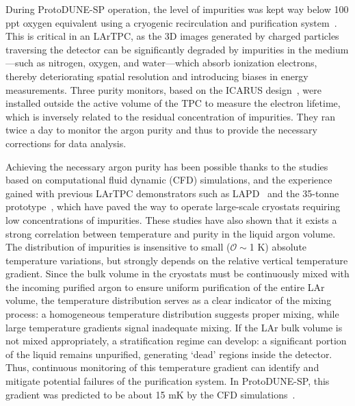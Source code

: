 
During ProtoDUNE-SP operation, the level of impurities was kept way below 100 ppt oxygen equivalent using a cryogenic recirculation and purification system~\cite{pdsp_tdr,pdsp_2}. This is critical in an LArTPC, as the 3D images generated by charged particles traversing the detector can be significantly degraded by impurities in the medium—such as nitrogen, oxygen, and water—which absorb ionization electrons, thereby deteriorating spatial resolution and introducing biases in energy measurements. Three purity monitors, based on the ICARUS design~\cite{PrMs}, were installed outside the active volume of the TPC to measure the electron lifetime, which is inversely related to the residual concentration of impurities. They ran twice a day to monitor the argon purity and thus to provide the necessary corrections for data analysis.

Achieving the necessary argon purity has been possible thanks to the studies based on computational fluid dynamic (CFD) simulations, and the experience gained with previous LArTPC demonstrators such as LAPD~\cite{lapd} and the 35-tonne prototype~\cite{35t_1,35t_2}, which have paved the way to operate large-scale cryostats requiring low concentrations of impurities. These studies have also shown that it exists a strong correlation between temperature and purity in the liquid argon volume. The distribution of impurities is insensitive to small ($\mathcal{O}\sim$1 K) absolute temperature variations, but strongly depends on the relative vertical temperature gradient. Since the bulk volume in the cryostats must be continuously mixed with the incoming purified argon to ensure uniform purification of the entire LAr volume, the temperature distribution serves as a clear indicator of the mixing process: a homogeneous temperature distribution suggests proper mixing, while large temperature gradients signal inadequate mixing. If the LAr bulk volume is not mixed appropriately, a stratification regime can develop: a significant portion of the liquid remains unpurified, generating `dead' regions inside the detector. Thus, continuous monitoring of this temperature gradient can identify and mitigate potential failures of the purification system. In ProtoDUNE-SP, this gradient was predicted to be about 15 mK by the CFD simulations~\cite{pdsp_tdr,dune_tdr4}.

